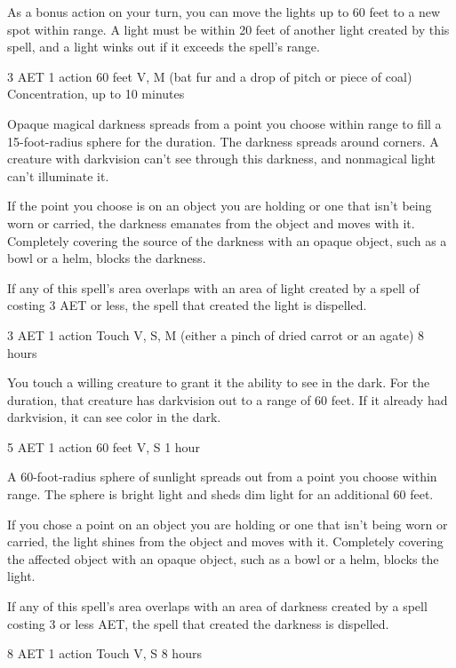 As a bonus action on your turn, you can move the lights up to 60 feet to a new spot within range. A light must be within 20 feet of another light created by this spell, and a light winks out if it exceeds the spell's range.


{3 AET}
{1 action}
{60 feet}
{V, M (bat fur and a drop of pitch or piece of coal)}
{Concentration, up to 10 minutes}

Opaque magical darkness spreads from a point you choose within range to fill a 15-foot-radius sphere for the duration. The darkness spreads around corners. A creature with darkvision can't see through this darkness, and nonmagical light can't illuminate it.

If the point you choose is on an object you are holding or one that isn't being worn or carried, the darkness emanates from the object and moves with it. Completely covering the source of the darkness with an opaque object, such as a bowl or a helm, blocks the darkness.

If any of this spell's area overlaps with an area of light created by a spell of costing 3 AET or less, the spell that created the light is dispelled.


{3 AET}
{1 action}
{Touch}
{V, S, M (either a pinch of dried carrot or an agate)}
{8 hours}

You touch a willing creature to grant it the ability to see in the dark. For the duration, that creature has darkvision out to a range of 60 feet. If it already had darkvision, it can see color in the dark.


{5 AET}
{1 action}
{60 feet}
{V, S}
{1 hour}

A 60-foot-radius sphere of sunlight spreads out from a point you choose within range. The sphere is bright light and sheds dim light for an additional 60 feet.

If you chose a point on an object you are holding or one that isn't being worn or carried, the light shines from the object and moves with it. Completely covering the affected object with an opaque object, such as a bowl or a helm, blocks the light.

If any of this spell's area overlaps with an area of darkness created by a spell costing 3 or less AET, the spell that created the darkness is dispelled.


{8 AET}
{1 action}
{Touch}
{V, S}
{8 hours}

